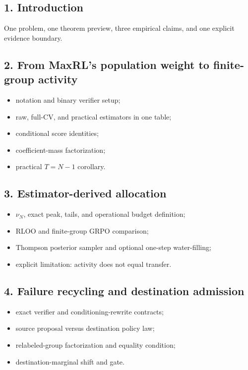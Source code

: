 \documentclass[11pt]{article}
\theoremstyle{definition}
\theoremstyle{remark}
\begin{document}
\subsection{1. Introduction}
One problem, one theorem preview, three empirical claims, and one explicit evidence boundary.

\subsection{2. From MaxRL's population weight to finite-group activity}

\begin{itemize}[leftmargin=2em]
\item notation and binary verifier setup;
\item raw, full-CV, and practical estimators in one table;
\item conditional score identities;
\item coefficient-mass factorization;
\item practical $T=N-1$ corollary.
\end{itemize}

\subsection{3. Estimator-derived allocation}

\begin{itemize}[leftmargin=2em]
\item $\nu_N$, exact peak, tails, and operational budget definition;
\item RLOO and finite-group GRPO comparison;
\item Thompson posterior sampler and optional one-step water-filling;
\item explicit limitation: activity does not equal transfer.
\end{itemize}

\subsection{4. Failure recycling and destination admission}

\begin{itemize}[leftmargin=2em]
\item exact verifier and conditioning-rewrite contracts;
\item source proposal versus destination policy law;
\item relabeled-group factorization and equality condition;
\item destination-marginal shift and gate.
\end{itemize}
\end{document}
